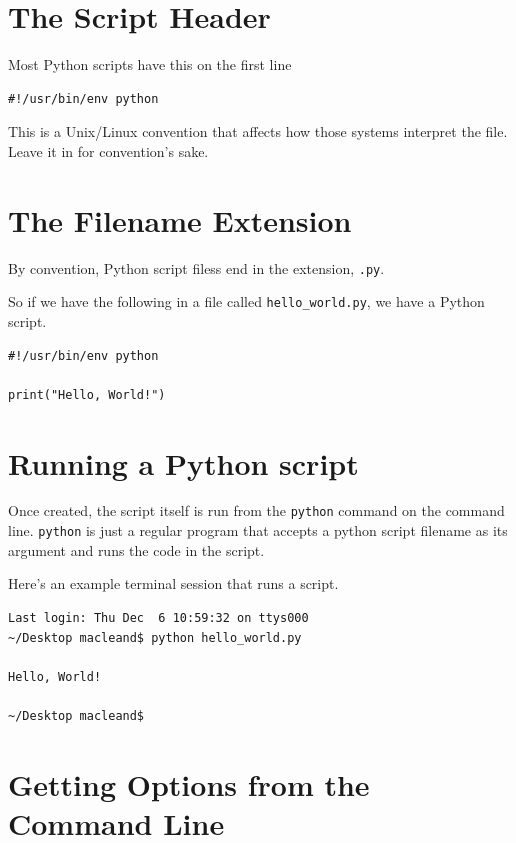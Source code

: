 \documentclass[]{book}
\theoremstyle{definition}
\theoremstyle{definition}
\theoremstyle{definition}
\theoremstyle{remark}
\begin{document}
\hypertarget{the-script-header}{%
\section{The Script Header}\label{the-script-header}}

Most Python scripts have this on the first line

\begin{verbatim}
#!/usr/bin/env python
\end{verbatim}

This is a Unix/Linux convention that affects how those systems interpret
the file. Leave it in for convention's sake.

\hypertarget{the-filename-extension}{%
\section{The Filename Extension}\label{the-filename-extension}}

By convention, Python script filess end in the extension, \texttt{.py}.

So if we have the following in a file called \texttt{hello\_world.py},
we have a Python script.

\begin{verbatim}
#!/usr/bin/env python

print("Hello, World!")
\end{verbatim}

\hypertarget{running-a-python-script}{%
\section{Running a Python script}\label{running-a-python-script}}

Once created, the script itself is run from the \texttt{python} command
on the command line. \texttt{python} is just a regular program that
accepts a python script filename as its argument and runs the code in
the script.

Here's an example terminal session that runs a script.

\begin{verbatim}
Last login: Thu Dec  6 10:59:32 on ttys000
~/Desktop macleand$ python hello_world.py

Hello, World!

~/Desktop macleand$
\end{verbatim}

\hypertarget{getting-options-from-the-command-line}{%
\section{Getting Options from the Command
Line}\label{getting-options-from-the-command-line}}
\end{document}
